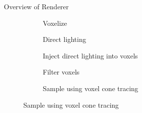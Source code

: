 \documentclass[10pt]{beamer}
\begin{document}
\begin{frame}{Overview of Renderer}
  \captionsetup[subfigure]{font=footnotesize,labelfont=footnotesize}
  \begin{figure}
    \renewcommand{\thesubfigure}{\arabic{subfigure}}
    \begin{subfigure}[t]{0.32\textwidth}
      \caption{Voxelize}
    \end{subfigure}
    \begin{subfigure}[t]{0.32\textwidth}
      \caption{Direct lighting}
    \end{subfigure}
    \begin{subfigure}[t]{0.32\textwidth}
      \caption{Inject direct lighting into voxels}
    \end{subfigure}

    \begin{subfigure}[t]{0.32\textwidth}
      \caption{Filter voxels}
    \end{subfigure}
    \begin{subfigure}[t]{0.32\textwidth}
      \caption{Sample using voxel cone tracing}
    \end{subfigure}
  \end{figure}
\end{frame}

\end{document}
